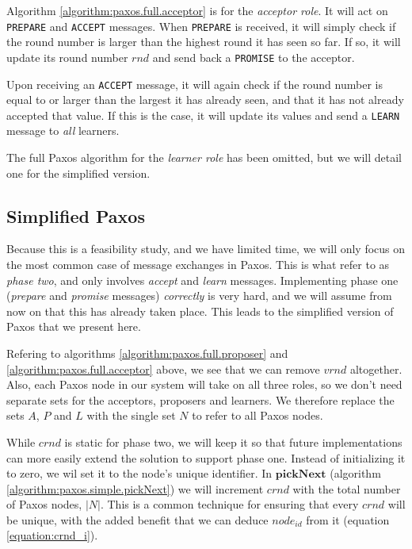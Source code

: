 Algorithm \ref{algorithm:paxos.full.acceptor}
 is for the \textit{acceptor
role}.  It will act on \texttt{PREPARE} and \texttt{ACCEPT} messages.
When \texttt{PREPARE} is received, it will simply check if the round number
is larger than the highest round it has seen so far.  If so, it will update
its round number $rnd$ and send back a \texttt{PROMISE} to the acceptor.

Upon receiving an \texttt{ACCEPT} message, it will again check if the round
number is equal to or larger than the largest it has already seen, and that
it has not already accepted that value.  If this is the case, it will update
its values and send a \texttt{LEARN} message to \textit{all} learners.

The full Paxos algorithm for the \textit{learner role} has been omitted, but
we will detail one for the simplified version.

\subsection{Simplified Paxos}
\label{ch:simplifying.paxos}

Because this is a feasibility study, and we have limited time, we will only
focus on the most common case of message exchanges in Paxos.
%
This is what \cite{Lam01,Lamport:1998:PP:279227.279229} refer to as
\textit{phase two}, and only involves \textit{accept} and \textit{learn}
messages.
%
Implementing phase one (\textit{prepare} and \textit{promise} messages)
\textit{correctly} is very hard, and we will assume from now on that this
has already taken place.
%
This leads to the simplified version of Paxos that we present here.

Refering to algorithms \ref{algorithm:paxos.full.proposer} and
\ref{algorithm:paxos.full.acceptor} above, we see that we can remove
$vrnd$ altogether.
%
Also, each Paxos node in our system will take on all three roles, so we
don't need separate sets for the acceptors, proposers and learners.
%
We therefore replace the sets $A$, $P$ and $L$ with the single set $N$ to
refer to all Paxos nodes.

While $crnd$ is static for phase two, we will keep it so that future
implementations can more easily extend the solution to support phase one.
%
Instead of initializing it to zero, we wil set it to the node's unique
identifier.
%
In $\textbf{pickNext}$ (algorithm \ref{algorithm:paxos.simple.pickNext}) we
will increment $crnd$ with the total number of Paxos nodes, $|N|$.
%
This is a common technique for ensuring that every $crnd$ will be unique,
with the added benefit that we can deduce $node_{id}$ from it (equation
\ref{equation:crnd_i}).

